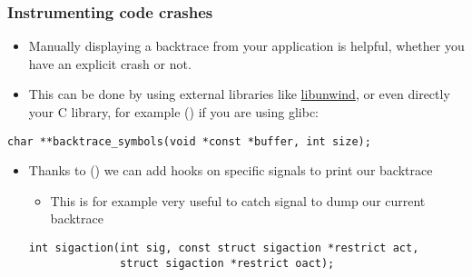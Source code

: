 \begin{frame}[fragile]
  \frametitle{Instrumenting code crashes}
  \begin{itemize}
      \item Manually displaying a backtrace from your application is
        helpful, whether you have an explicit crash or not.
      \item This can be done by using external libraries like
        \href{https://www.nongnu.org/libunwind/man/libunwind(3).html}{libunwind},
        or even directly your C library, for example 
        () if you are using glibc:
  \end{itemize}
    \begin{block}{}
      \begin{verbatim}
char **backtrace_symbols(void *const *buffer, int size);
      \end{verbatim}
    \end{block}

  \begin{itemize}
	  \item Thanks to  ()
          we can add hooks on specific signals to print our backtrace
    \begin{itemize}
      \item This is for example very useful to catch  signal to dump our current backtrace
    \end{itemize}
    \begin{block}{}
      \begin{verbatim}
int sigaction(int sig, const struct sigaction *restrict act,
              struct sigaction *restrict oact);
      \end{verbatim}
    \end{block}
  \end{itemize}
\end{frame}

